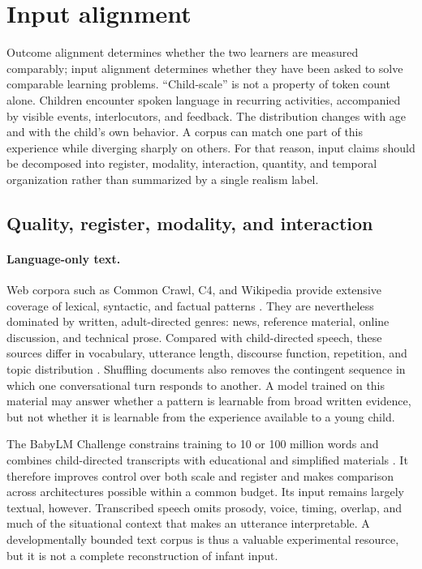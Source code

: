 \section{Input alignment}
\label{sec:litreview:input}

Outcome alignment determines whether the two learners are measured comparably; input alignment determines whether they have been asked to solve comparable learning problems. ``Child-scale'' is not a property of token count alone. Children encounter spoken language in recurring activities, accompanied by visible events, interlocutors, and feedback. The distribution changes with age and with the child's own behavior. A corpus can match one part of this experience while diverging sharply on others. For that reason, input claims should be decomposed into register, modality, interaction, quantity, and temporal organization rather than summarized by a single realism label.

\subsection{Quality, register, modality, and interaction}
\label{sec:litreview:input-quality}

\paragraph{Language-only text.}
Web corpora such as Common Crawl, C4, and Wikipedia provide extensive coverage of lexical, syntactic, and factual patterns \citep{buck2014n,raffel2020exploring,Kaplan2020}. They are nevertheless dominated by written, adult-directed genres: news, reference material, online discussion, and technical prose. Compared with child-directed speech, these sources differ in vocabulary, utterance length, discourse function, repetition, and topic distribution \citep{Huebner2021}. Shuffling documents also removes the contingent sequence in which one conversational turn responds to another. A model trained on this material may answer whether a pattern is learnable from broad written evidence, but not whether it is learnable from the experience available to a young child.

The BabyLM Challenge constrains training to 10 or 100 million words and combines child-directed transcripts with educational and simplified materials \citep{Warstadt2023}. It therefore improves control over both scale and register and makes comparison across architectures possible within a common budget. Its input remains largely textual, however. Transcribed speech omits prosody, voice, timing, overlap, and much of the situational context that makes an utterance interpretable. A developmentally bounded text corpus is thus a valuable experimental resource, but it is not a complete reconstruction of infant input.

